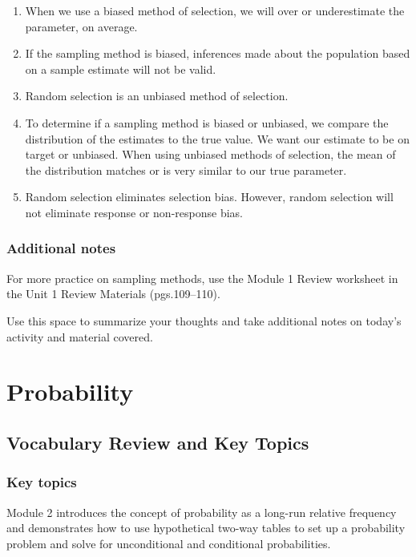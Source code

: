 \documentclass[
]{report}
\begin{document}
\begin{enumerate}
\def\labelenumi{\arabic{enumi}.}
\item
  When we use a biased method of selection, we will over or underestimate the parameter, on average.
\item
  If the sampling method is biased, inferences made about the population based on a sample estimate will not be valid.
\item
  Random selection is an unbiased method of selection.
\item
  To determine if a sampling method is biased or unbiased, we compare the distribution of the estimates to the true value. We want our estimate to be on target or unbiased. When using unbiased methods of selection, the mean of the distribution matches or is very similar to our true parameter.
\item
  Random selection eliminates selection bias. However, random selection will not eliminate response or non-response bias.
\end{enumerate}

\subsection{Additional notes}\label{additional-notes-1}

For more practice on sampling methods, use the Module 1 Review worksheet in the Unit 1 Review Materials (pgs.109--110).

Use this space to summarize your thoughts and take additional notes on today's activity and material covered.

\newpage

\chapter{Probability}\label{probability}

\section{Vocabulary Review and Key Topics}\label{vocabulary-review-and-key-topics-1}

\subsection{Key topics}\label{key-topics-1}

Module 2 introduces the concept of probability as a long-run relative frequency and demonstrates how to use hypothetical two-way tables to set up a probability problem and solve for unconditional and conditional probabilities.
\end{document}
